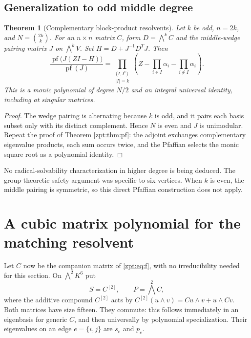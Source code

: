 \documentclass[11pt,letterpaper]{article}
\numberwithin{equation}{section}
\newtheorem{theorem}{Theorem}[section]
\theoremstyle{definition}
\theoremstyle{remark}
\DeclareMathOperator{\pf}{pf}
\begin{document}
\subsection{Generalization to odd middle degree}
\begin{theorem}[Complementary block-product resolvents]
\label{zpt:thm:general-pf}
Let $k$ be odd, $n=2k$, and $N=\binom{2k}{k}$. For an $n\times n$ matrix
$C$, form $D=\bigwedge^k C$ and the middle-wedge pairing matrix $J$ on
$\bigwedge^k V$. Set $H=D+J^{-1}D^TJ$. Then
\begin{equation}
 \frac{\pf\bigl(J(ZI-H)\bigr)}{\pf(J)}
 =\prod_{\substack{\{I,I^c\}\\|I|=k}}
       \left(Z-\prod_{i\in I}\alpha_i-\prod_{i\notin I}\alpha_i\right).
 \label{zpt:eq:general-pf}
\end{equation}
This is a monic polynomial of degree $N/2$ and an integral universal
identity, including at singular matrices.
\end{theorem}
\begin{proof}
The wedge pairing is alternating because $k$ is odd, and it pairs each
basis subset only with its distinct complement. Hence $N$ is even and
$J$ is unimodular. Repeat the proof of Theorem \ref{zpt:thm:pf}: the adjoint
exchanges complementary eigenvalue products, each sum occurs twice,
and the Pfaffian selects the monic square root as a polynomial identity.
\end{proof}
No radical-solvability characterization in higher degree is being deduced.
The group-theoretic safety argument was specific to six vertices. When
$k$ is even, the middle pairing is symmetric, so this direct Pfaffian
construction does not apply.

\section{A cubic matrix polynomial for the matching resolvent}
\label{zpt:sec:matching-matrix}
Let $C$ now be the companion matrix of \eqref{zpt:eq:f}, with no
irreducibility needed for this section. On $\bigwedge^2K^6$ put
\begin{equation}
 S=C^{[2]},\qquad P=\bigwedge^2C,\label{zpt:eq:SP}
\end{equation}
where the additive compound $C^{[2]}$ acts by
$C^{[2]}(u\wedge v)=Cu\wedge v+u\wedge Cv$.
Both matrices have size fifteen. They commute: this follows immediately
in an eigenbasis for generic $C$, and then universally by polynomial
specialization. Their eigenvalues on an edge $e=\{i,j\}$ are $s_e$ and
$p_e$.
\end{document}
